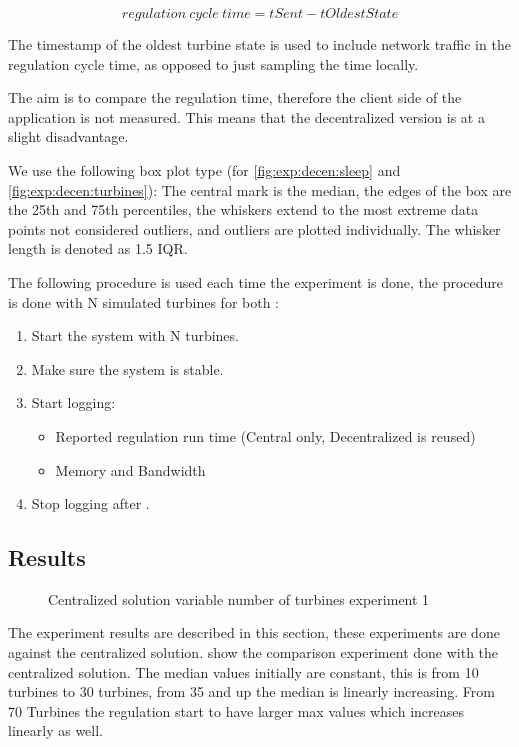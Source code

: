 $$regulation~cycle~time=tSent-tOldestState$$

The timestamp of the oldest turbine state is used to include network traffic in the regulation cycle time, as opposed to just sampling the time locally.

The aim is to compare the regulation time, therefore the client side of the application is not measured. This means that the decentralized version is at a slight disadvantage.

We use the following box plot type (for \cref{fig:exp:decen:sleep} and \cref{fig:exp:decen:turbines}): The central mark is the median, the edges of the box are the 25th and 75th percentiles, the whiskers extend to the most extreme data points not considered outliers, and outliers are plotted individually. The whisker length is denoted as 1.5 IQR. 


The following procedure is used each time the experiment is done, the procedure is done with N simulated turbines for both :

\begin{minipage}{\textwidth}
	\begin{enumerate}
		\item Start the system with N turbines.
		\item Make sure the system is stable.
		\item Start logging:
		\begin{itemize}
			\item Reported regulation run time (Central only, Decentralized is reused)
			\item Memory and Bandwidth
		\end{itemize}
		\item Stop logging after \experiemntRunTime.
		\end{enumerate}
\end{minipage}


\subsection{Results}

\begin{figure}[h!]
	\centering
%	
%	
	
	\caption{Centralized solution variable number of turbines experiment 1}
	\label{fig:exp:cen:turbines}
\end{figure}

The  experiment results are described in this section, these experiments are done against the centralized solution.  show the comparison experiment done with the centralized solution. The median values initially are constant, this is from 10 turbines to 30 turbines, from 35 and up the median is linearly increasing.
From 70 Turbines the regulation start to have larger max values which increases linearly as well.





